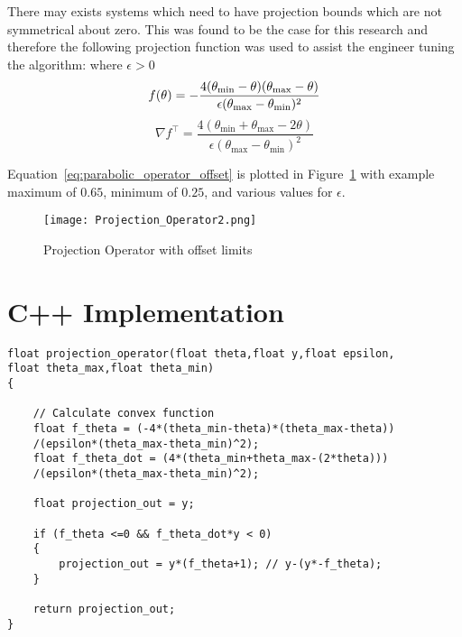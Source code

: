 There may exists systems which need to have projection bounds which are not symmetrical about zero.  This was found to be the case for this research and therefore the following projection function was used to assist the engineer tuning the algorithm:\newline
\newline
where $\epsilon>0$
\begin{equation}\label{eq:parabolic_operator_offset}
	f(\theta)=-\frac{4(\theta_{\text{min}}-\theta)(\theta_{\text{max}}-\theta)}{\epsilon(\theta_{\text{max}}-\theta_{\text{min}})^2}\\
\end{equation}
\begin{equation}
	\nabla f^\top=\frac{4(\theta_{\text{min}}+\theta_{\text{max}}-2\theta)}{\epsilon(\theta_{\text{max}}-\theta_{\text{min}})^2}
\end{equation}


Equation~\ref{eq:parabolic_operator_offset} is plotted in Figure~\ref{fig:projection_operator_offset} with example maximum of $0.65$, minimum of $0.25$,  and various values for $\epsilon$. 
\begin{figure}[h!]
 \centering
  \texttt{[image: Projection\_Operator2.png]}
  \caption{Projection Operator with offset limits}
  \label{fig:projection_operator_offset}
\end{figure}

\section{C++ Implementation}


\begin{lstlisting}
float projection_operator(float theta,float y,float epsilon,
float theta_max,float theta_min)
{
	
	// Calculate convex function
	float f_theta = (-4*(theta_min-theta)*(theta_max-theta))
	/(epsilon*(theta_max-theta_min)^2);
	float f_theta_dot = (4*(theta_min+theta_max-(2*theta)))
	/(epsilon*(theta_max-theta_min)^2);	

	float projection_out = y;

	if (f_theta <=0 && f_theta_dot*y < 0)
	{
		projection_out = y*(f_theta+1); // y-(y*-f_theta);
	}	
 
   	return projection_out;
}
\end{lstlisting}